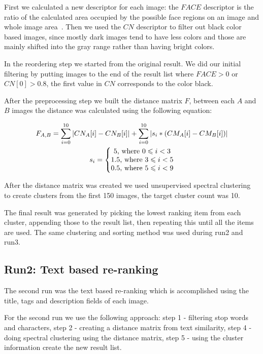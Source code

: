 \documentclass{acm_proc_article-me}
\begin{document}
First we calculated a new descriptor for each image: the $FACE$ descriptor is the ratio of the calculated area occupied by the possible face regions on an image and whole
image area~\cite{szHucs2013bmemtm}. Then we used the $CN$ descriptor to filter out black color based images, since mostly dark images tend to have less colors and those are mainly shifted into the gray range rather than having bright colors.

In the reordering step we started from the original result. We did our initial filtering by putting images to the end of the result list where $FACE>0$ or $CN[0]>0.8$, the first value in $CN$ corresponds to the color black.

After the preprocessing step we built the distance matrix $F$, between each $A$ and $B$ images the distance was calculated using the following equation:

\begin{gather*} 
F_{A,B} = \sum_{i=0}^{10}  \left | CN_{A}[i]-CN_{B}[i] \right | +\sum_{i=0}^{10} \left | s_i * (CM_{A}[i]-CM_{B}[i]) \right |\\
s_i = \left\{\begin{matrix}
5 \textup{, where }0 \leqslant  i < 3\\ 
1.5 \textup{, where }3 \leqslant  i < 5\\ 
0.5 \textup{, where }5 \leqslant  i < 9
\end{matrix}\right.
\end{gather*}

After the distance matrix was created we used unsupervised spectral clustering~\cite{Ma2009,Ng01onspectral} to create clusters from the first 150 images, the target cluster count was 10. 

The final result was generated by picking the lowest ranking item from each cluster, appending those to the result list, then repeating this until all the items are used. The same clustering and sorting method was used during run2 and run3.

\subsection{Run2: Text based re-ranking}\label{run2}
The second run was the text based re-ranking which is accomplished using the title, tags and description fields of each image.

For the second run we use the following approach: step 1 - filtering stop words and characters, step 2 - creating a distance matrix from text similarity, step 4 - doing spectral clustering using the distance matrix, step 5 - using the cluster information create the new result list.
\end{document}
